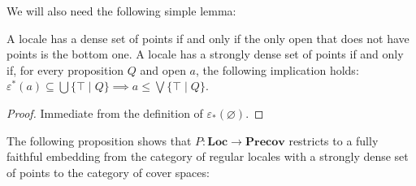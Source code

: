 \documentclass[reqno]{amsart}
\theoremstyle{definition}
\theoremstyle{remark}
\numberwithin{figure}{section}
\newcommand{\cat}[1]{\mathbf{#1}}
\begin{document}
We will also need the following simple lemma:

\begin{lem}
A locale has a dense set of points if and only if the only open that does not have points is the bottom one.
A locale has a strongly dense set of points if and only if, for every proposition $Q$ and open $a$, the following implication holds: $\varepsilon^*(a) \subseteq \bigcup \{ \top \mid Q \} \implies a \leq \bigvee \{ \top \mid Q \}$.
\end{lem}
\begin{proof}
Immediate from the definition of $\varepsilon_*(\varnothing)$.
\end{proof}

The following proposition shows that $P : \cat{Loc} \to \cat{Precov}$ restricts to a fully faithful embedding from the category of regular locales with a strongly dense set of points to the category of cover spaces:
\end{document}
